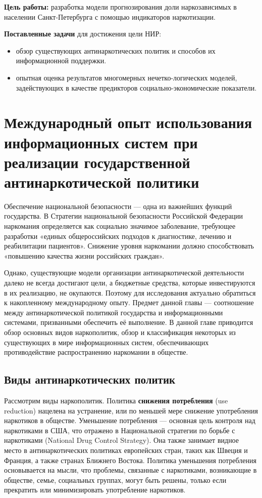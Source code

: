 \documentclass[a4paper,14pt]{article}
\begin{document}
\textbf{Цель работы:} разработка модели прогнозирования доли наркозависимых в 
населении Санкт-Петербурга с помощью индикаторов наркотизации.

\textbf{Поставленные задачи} для достижения цели НИР:
\begin{itemize}
    \item обзор существующих антинаркотических политик и способов их 
        информационной поддержки.
    \item опытная оценка результатов многомерных нечетко-логических моделей, 
        задействующих в качестве предикторов социально-экономические показатели.
\end{itemize} 



\newpage
\section{Международный опыт использования информационных систем при реализации 
    государственной антинаркотической политики}

Обеспечение национальной безопасности — одна из важнейших функций государства.  
В Стратегии национальной безопасности Российской Федерации 
\cite{ru_nat_def_strat} наркомания определяется как социально значимое 
заболевание, требующее разработки «единых общероссийских подходов к диагностике, 
лечению и реабилитации пациентов».  Снижение уровня наркомании должно 
способствовать «повышению качества жизни российских граждан».

Однако, существующие модели организации антинаркотической деятельности далеко не 
всегда достигают цели, а бюджетные средства, которые инвестируются в их 
реализацию, не окупаются. Поэтому для исследования актуально обратиться к 
накопленному международному опыту. Предмет данной главы — соотношение между 
антинаркотической политикой государства и информационными системами, призванными 
обеспечить её выполнение. В данной главе приводится обзор основных видов 
наркополитик, обзор и классификация некоторых из существующих в мире 
информационных систем, обеспечивающих противодействие распространению наркомании 
в обществе.

\subsection{Виды антинаркотических политик}

Рассмотрим виды наркополитик. Политика \textbf{снижения потребления} (use 
reduction) нацелена на устранение, или по меньшей мере снижение употребления 
наркотиков в обществе. Уменьшение потребления —  основная цель контроля над 
наркотиками в США, что отражено в Национальной стратегии по борьбе с наркотиками 
(National Drug Control Strategy)\cite{us_nat_drug_strat}. Она также занимает 
видное место в антинаркотических политиках европейских стран, таких как Швеция и 
Франция, а также странах Ближнего Востока. Политика уменьшения потребления 
основывается на мысли, что проблемы, связанные с наркотиками,  возникающие в 
обществе, семье, социальных группах, могут быть решены, только если прекратить 
или минимизировать употребление наркотиков. 
\end{document}
